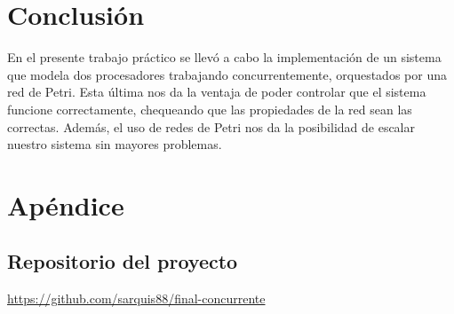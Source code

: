\documentclass{article}
\begin{document}
    \section{Conclusión}
    En el presente trabajo práctico se llevó a cabo la implementación de un sistema que modela
    dos procesadores trabajando concurrentemente, orquestados por una red de Petri. Esta última
    nos da la ventaja de poder controlar que el sistema funcione correctamente, chequeando que
    las propiedades de la red sean las correctas. Además, el uso de redes de Petri nos da la 
    posibilidad de escalar nuestro sistema sin mayores problemas.
    \newpage 
    \section{Apéndice}
    \subsection{Repositorio del proyecto}
    \url{https://github.com/sarquis88/final-concurrente}
\end{document}
